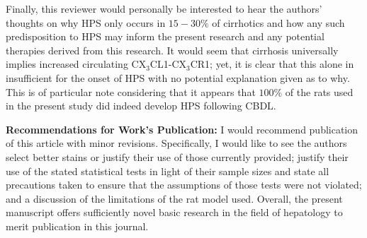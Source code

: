 \documentclass[11pt,letterpaper,final] {article}
\begin{document}
Finally, this reviewer would personally be interested to hear the authors' thoughts on why HPS only occurs in $15-30\%$ of cirrhotics and how any such predisposition to HPS may inform the present research and any potential therapies derived from this research. It would seem that cirrhosis universally implies increased circulating CX$_3$CL1-CX$_3$CR1; yet, it is clear that this alone in insufficient for the onset of HPS with no potential explanation given as to why. This is of particular note considering that it appears that $100\%$ of the rats used in the present study did indeed develop HPS following CBDL.

{\bfseries Recommendations for Work's Publication: } I would recommend publication of this article with minor revisions. Specifically, I would like to see the authors select better stains or justify their use of those currently provided; justify their use of the stated statistical tests in light of their sample sizes and state all precautions taken to ensure that the assumptions of those tests were not violated; and a discussion of the limitations of the rat model used. Overall, the present manuscript offers sufficiently novel basic research in the field of hepatology to merit publication in this journal.


% 
% 
\end{document}
